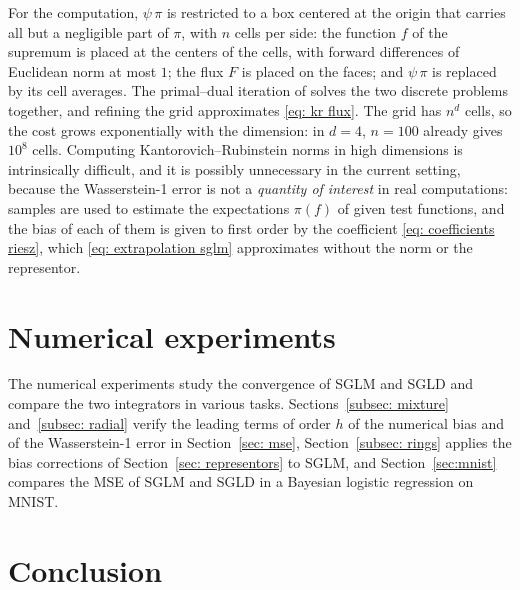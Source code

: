 \documentclass{article}
\numberwithin{equation}{section}
\begin{document}
For the computation, $\psi\,\pi$ is restricted to a box centered at the origin that carries all but a negligible part of $\pi$, with $n$ cells per side: the function $f$ of the supremum is placed at the centers of the cells, with forward differences of Euclidean norm at most $1$; the flux $F$ is placed on the faces; and $\psi\,\pi$ is replaced by its cell averages. The primal--dual iteration of \citet{li2018parallel} solves the two discrete problems together, and refining the grid approximates \eqref{eq: kr flux}.
The grid has $n^d$ cells, so the cost grows exponentially with the dimension: in $d=4$, $n = 100$ already gives $10^8$ cells. Computing Kantorovich--Rubinstein norms in high dimensions is intrinsically difficult, and it is possibly unnecessary in the current setting, because the Wasserstein-1 error is not a \emph{quantity of interest} in real computations: samples are used to estimate the expectations $\pi(f)$ of given test functions, and the bias of each of them is given to first order by the coefficient \eqref{eq: coefficients riesz}, which \eqref{eq: extrapolation sglm} approximates without the norm or the representor.

\section{Numerical experiments}
\label{sec: numerics}

The numerical experiments study the convergence of SGLM and SGLD and compare the two integrators in various tasks. Sections~\ref{subsec: mixture} and~\ref{subsec: radial} verify the leading terms of order $h$ of the numerical bias and of the Wasserstein-1 error in Section~\ref{sec: mse}, Section~\ref{subsec: rings} applies the bias corrections of Section~\ref{sec: representors} to SGLM, and Section~\ref{sec:mnist} compares the MSE of SGLM and SGLD in a Bayesian logistic regression on MNIST.





\section{Conclusion}
\label{sec: conclusion}
\end{document}

